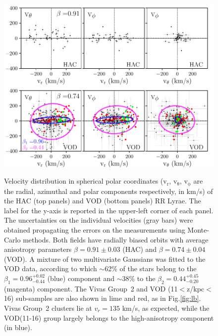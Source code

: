 \documentclass[fleqn,usenatbib]{mnras}
\begin{document}
\begin{figure}
	\includegraphics[scale=0.55]{HAC_allv.pdf}
  \includegraphics[scale=0.55]{VOD_allv.pdf}
   \vspace{-0.45cm}
    \caption{Velocity distribution in spherical polar coordinates
      ($\mathrm{v_{r}}$, $\mathrm{v_{\theta}}$, $\mathrm{v_{\phi}}$
      are the radial, azimuthal and polar components respectively, in
      km/s) of the HAC (top panels) and VOD (bottom panels) RR Lyrae.
      The label for the y-axis is reported in the upper-left corner of
      each panel. The uncertainties on the individual velocities (gray
      bars) were obtained propagating the errors on the measurements
      using Monte-Carlo methods. Both fields have radially biased
      orbits with average anisotropy parameters $\beta= 0.91 \pm 0.03$ (HAC)
      and $\beta= 0.74 \pm 0.04$ (VOD). A mixture of two multivariate
      Gaussians was fitted to the VOD data, according to which
      $\sim$62\% of the stars belong to the $\beta_{1}=
      0.96^{+0.02}_{-0.44}$ (blue) component and $\sim$38\% to the
      $\beta_{2}=0.44^{+0.45}_{-0.20}$ (magenta) component. The Vivas
      Group~2 and VOD (11$<$z/kpc$<$16) sub-samples are also shown in lime and
      red, as in Fig.\ref{fig:lb}. Vivas Group~2 clusters lie at $v_{r} =
      135$ km/s, as expected, while the VOD(11-16) group largely
      belongs to the high-anisotropy component (in blue).}
    \label{fig:vel}
\end{figure}
%
\end{document}
